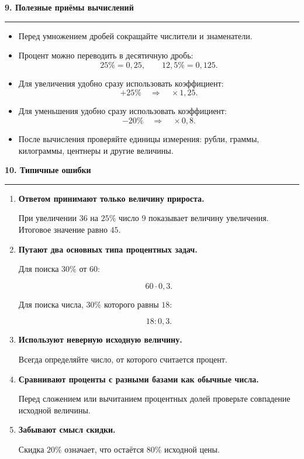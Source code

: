 \documentclass[a4paper,12pt]{article}
\newcommand{\sectiontitle}[1]{%
    \vspace{0.6em}
    {\Large\bfseries\color{darkaccent}#1\par}
    \vspace{0.15em}
    {\color{accent}\rule{\linewidth}{0.6pt}}
    \vspace{0.4em}
}
\newcommand{\key}[1]{\textbf{\textcolor{darkaccent}{#1}}}
\begin{document}
\sectiontitle{9. Полезные приёмы вычислений}

\begin{itemize}

    \item Перед умножением дробей сокращайте числители и знаменатели.

    \item Процент можно переводить в десятичную дробь:
    \[
    25\%=0{,}25,\qquad
    12{,}5\%=0{,}125.
    \]

    \item Для увеличения удобно сразу использовать коэффициент:
    \[
    +25\%
    \quad\Longrightarrow\quad
    \times1{,}25.
    \]

    \item Для уменьшения удобно сразу использовать коэффициент:
    \[
    -20\%
    \quad\Longrightarrow\quad
    \times0{,}8.
    \]

    \item После вычисления проверяйте единицы измерения:
    рубли, граммы, килограммы, центнеры и другие величины.

\end{itemize}

\sectiontitle{10. Типичные ошибки}

\begin{enumerate}

    \item \key{Ответом принимают только величину прироста.}

    При увеличении \(36\) на \(25\%\) число \(9\) показывает величину
    увеличения. Итоговое значение равно \(45\).

    \item \key{Путают два основных типа процентных задач.}

    Для поиска \(30\%\) от \(60\):

    \[
    60\cdot0{,}3.
    \]

    Для поиска числа, \(30\%\) которого равны \(18\):

    \[
    18:0{,}3.
    \]

    \item \key{Используют неверную исходную величину.}

    Всегда определяйте число, от которого считается процент.

    \item \key{Сравнивают проценты с разными базами как обычные числа.}

    Перед сложением или вычитанием процентных долей проверьте совпадение
    исходной величины.

    \item \key{Забывают смысл скидки.}

    Скидка \(20\%\) означает, что остаётся \(80\%\) исходной цены.

\end{enumerate}
\end{document}
